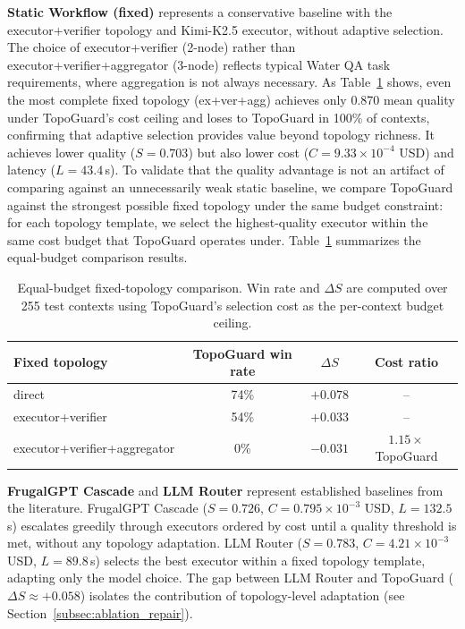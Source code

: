 \documentclass[manuscript,review,anonymous]{acmart}
\begin{document}
\textbf{Static Workflow (fixed)} represents a conservative baseline with the executor+verifier topology and Kimi-K2.5 executor, without adaptive selection. The choice of executor+verifier (2-node) rather than executor+verifier+aggregator (3-node) reflects typical Water QA task requirements, where aggregation is not always necessary. As Table~\ref{tab:strong_static} shows, even the most complete fixed topology (ex+ver+agg) achieves only 0.870 mean quality under TopoGuard's cost ceiling and loses to TopoGuard in 100\% of contexts, confirming that adaptive selection provides value beyond topology richness. It achieves lower quality ($S=0.703$) but also lower cost ($C=9.33\times10^{-4}$ USD) and latency ($L=43.4$\,s). To validate that the quality advantage is not an artifact of comparing against an unnecessarily weak static baseline, we compare TopoGuard against the strongest possible fixed topology under the same budget constraint: for each topology template, we select the highest-quality executor within the same cost budget that TopoGuard operates under. Table~\ref{tab:strong_static} summarizes the equal-budget comparison results.

\begin{table}[t]
\centering
\caption{Equal-budget fixed-topology comparison. Win rate and $\Delta S$ are computed over 255 test contexts using TopoGuard's selection cost as the per-context budget ceiling.}
\label{tab:strong_static}
\small
\begin{tabular}{lccc}
\toprule
\textbf{Fixed topology} & \textbf{TopoGuard win rate} & \textbf{$\Delta S$} & \textbf{Cost ratio} \\
\midrule
direct & 74\% & $+0.078$ & -- \\
executor+verifier & 54\% & $+0.033$ & -- \\
executor+verifier+aggregator & 0\% & $-0.031$ & $1.15\times$ TopoGuard \\
\bottomrule
\end{tabular}
\end{table}

\textbf{FrugalGPT Cascade} and \textbf{LLM Router} represent established baselines from the literature. FrugalGPT Cascade ($S=0.726$, $C=0.795\times10^{-3}$ USD, $L=132.5$\,s) escalates greedily through executors ordered by cost until a quality threshold is met, without any topology adaptation. LLM Router ($S=0.783$, $C=4.21\times10^{-3}$ USD, $L=89.8$\,s) selects the best executor within a fixed topology template, adapting only the model choice. The gap between LLM Router and TopoGuard ($\Delta S \approx +0.058$) isolates the contribution of topology-level adaptation (see Section~\ref{subsec:ablation_repair}).
\end{document}
